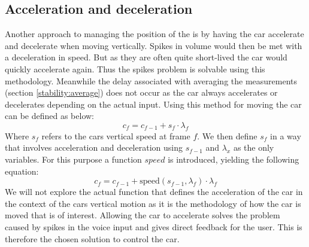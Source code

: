 \subsection{Acceleration and deceleration}\label{stability:acceleration}
Another approach to managing the position of the is by having the car accelerate and decelerate when moving vertically.
Spikes in volume would then be met with a deceleration in speed.
But as they are often quite short-lived the car would quickly accelerate again.
Thus the spikes problem is solvable using this methodology.
Meanwhile the delay associated with averaging the measurements (section \ref{stability:average}) does not occur as the car always accelerates or decelerates depending on the actual input.
Using this method for moving the car can be defined as below:
$$c_f = c_{f-1} + s_f \cdot \lambda_f$$
Where $s_f$ refers to the cars vertical speed at frame $f$.
We then 	define $s_f$ in a way that involves acceleration and deceleration using $s_{f-1}$ and $\lambda_x$ as the only variables.
For this purpose a function $speed$ is introduced, yielding the following equation:
$$c_f = c_{f-1} + \text{speed}(s_{f-1}, \lambda_f) \cdot \lambda_f$$
We will not explore the actual function that defines the acceleration of the car in the context of the cars vertical motion as it is the methodology of how the car is moved that is of interest.
Allowing the car to accelerate solves the problem caused by spikes in the voice input and gives direct feedback for the user.
This is therefore the chosen solution to control the car.
